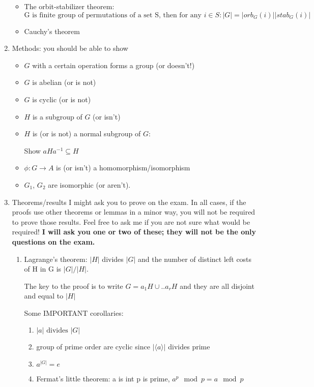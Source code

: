 \documentclass[11pt, oneside]{article}
\begin{document}
\begin{enumerate}
\begin{itemize}
\item The orbit-stabilizer theorem: \[\text{G is finite group of permutations of a set S, then for any } i\in S: |G|=|orb_G(i)||stab_G(i)|\]
\item Cauchy's theorem
\end{itemize}

\newpage
\item Methods: you should be able to show
\begin{itemize}
\item  $G$ with a certain operation forms a group (or doesn't!)
\item $G$ is abelian (or is not)
\item $G$ is cyclic (or is not)
\item $H$ is a subgroup of $G$ (or isn't)
\item $H$ is (or is not) a normal subgroup of $G$:

Show $aHa^{-1}\subseteq H$ 
\item $\phi:G\rightarrow A$ is (or isn't) a homomorphism/isomorphism
\item $G_1$, $G_2$ are isomorphic (or aren't).
\end{itemize}

\newpage


\item Theorems/results I might ask you to prove on the exam. In all cases, if the proofs use other theorems or lemmas in a minor way, you will not be required to prove those results. Feel free to ask me if you are not sure what would be required! {\bf I will ask you one or two of these; they will not be the only questions on the exam.}
\begin{enumerate}


\item Lagrange's theorem: $|H|$ divides $|G|$ and the number of distinct left costs of H in G is $|G|/|H|$. 

The key to the proof is to write $G=a_1H\cup ..a_rH$ and they are all disjoint and equal to $|H|$

Some IMPORTANT corollaries:\begin{enumerate}
    \item $|a| \text{ divides } |G|$
    \item group of prime order are cyclic since $|\langle a \rangle|$ divides prime
    \item $a^{|G|}=e$
    \item Fermat's little theorem: a is int p is prime, $a^p\mod p= a \mod p$
\end{enumerate}



\end{enumerate}
\end{enumerate}
\end{document}
